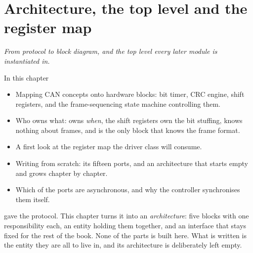 
\chapter{Architecture, the top level and the register map}
\label{c11:ch}

{\large\itshape From protocol to block diagram, and the top level every later module is instantiated
in.\par}

\begin{chapterbox}{In this chapter}
\begin{itemize}
  \item Mapping CAN concepts onto hardware blocks: bit timer, CRC engine, shift registers, and the
    frame-sequencing state machine controlling them.
  \item Who owns what:  owns \emph{when}, the shift registers own the bit stuffing,
     knows nothing about frames, and  is the only block that knows
    the frame format.
  \item A first look at the register map the driver class will consume.
  \item Writing  from scratch: its fifteen ports, and an architecture that
    starts empty and grows chapter by chapter.
  \item Which of the ports are asynchronous, and why the controller synchronises them itself.
\end{itemize}
\end{chapterbox}

 gave the protocol. This chapter turns it into an \emph{architecture}: five blocks
with one responsibility each, an entity holding them together, and an interface that stays fixed for
the rest of the book. None of the parts is built here. What is written is the entity they are all to
live in, and its architecture is deliberately left empty.





